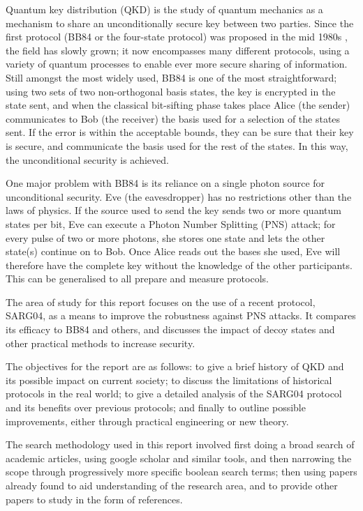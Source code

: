 \documentclass[paper=a4, fontsize=11pt]{scrartcl} %
\numberwithin{equation}{section} %
\numberwithin{figure}{section} %
\numberwithin{table}{section} %
\begin{document}
Quantum key distribution (QKD) is the study of quantum mechanics
as a mechanism to share an unconditionally secure key between two parties. Since the first
protocol (BB84 or the four-state protocol) was proposed in the mid 1980s \citep{BB84},
the field has slowly grown; it now encompasses many different
protocols, using a variety of quantum processes to enable ever more secure
sharing of information. Still amongst the most widely
used, BB84 is one of the most straightforward; using two sets of two non-orthogonal basis states,
the key is encrypted in the state sent, and when the classical bit-sifting phase
takes place Alice (the sender) communicates to Bob (the receiver) the basis used for a selection
of the states sent. If the error is within the acceptable bounds, they can be sure that
their key is secure, and communicate the basis used for the rest of the states. In this
way, the unconditional security is achieved.

One major problem with BB84 is its reliance on a single photon source for unconditional security.
Eve (the eavesdropper) has no restrictions other than the laws of physics. If the source used to send the key sends two or more quantum
states per bit, Eve can execute a Photon Number Splitting (PNS) attack; for every pulse of two or more photons,
she stores one state and lets the other state(s) continue on to Bob. Once Alice reads out the bases she used, Eve
will therefore have the complete key without the knowledge of the other participants. This
can be generalised to all prepare and measure protocols.

The area of study for this report focuses on the use of a recent protocol, SARG04, as a means to improve the
robustness against PNS attacks. It compares its efficacy
to BB84 and others, and discusses the impact of decoy states and other practical methods to increase security.

The objectives for the report are as follows: to give a brief history of QKD and its possible impact on current
society; to discuss the limitations of historical protocols in the real world; to give a detailed analysis of the
SARG04 protocol and its benefits over previous protocols; and finally to outline possible improvements,
either through practical engineering or new theory.

The search methodology used in this report involved first doing a broad search of academic articles, using google scholar and similar
tools, and then narrowing the scope through progressively more specific boolean search terms; then using papers already found to aid understanding
of the research area, and to provide other papers to study in the form of references.
\end{document}
